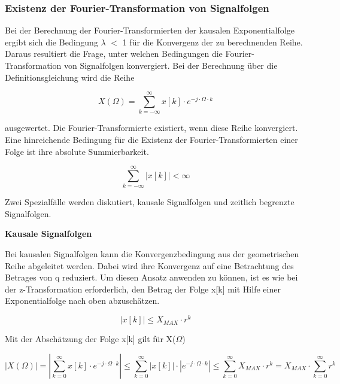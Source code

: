\subsubsection{Existenz der Fourier-Transformation von Signalfolgen}

\noindent Bei der Berechnung der Fourier-Transformierten der kausalen Exponentialfolge ergibt sich die Bedingung {\textbar}$\lambda${\textbar} $\mathrm{<}$ 1 f\"{u}r die Konvergenz der zu berechnenden Reihe. Daraus resultiert die Frage, unter welchen Bedingungen die Fourier-Transformation von Signalfolgen konvergiert. Bei der Berechnung \"{u}ber die Definitionsgleichung wird die Reihe 

\begin{equation}\label{eq:seventwentynine}
X\left(\Omega \right)=\sum _{k=-\infty }^{\infty }x\left[k\right]\cdot e^{-j\cdot \Omega \cdot k}
\end{equation}

\noindent ausgewertet. Die Fourier-Transformierte existiert, wenn diese Reihe konvergiert. Eine hinreichende Bedingung f\"{u}r die Existenz der Fourier-Transformierten einer Folge ist ihre absolute Summierbarkeit.

\begin{equation}\label{eq:seventhirty}
\sum _{k=-\infty }^{\infty }\left|x\left[k\right]\right|<\infty
\end{equation}

\noindent Zwei Spezialf\"{a}lle werden diskutiert, kausale Signalfolgen und zeitlich begrenzte Signalfolgen.\bigskip

{\selectfont
\noindent\textbf{Kausale Signalfolgen}}\smallskip

\noindent Bei kausalen Signalfolgen kann die Konvergenzbedingung aus der geometrischen Reihe abgeleitet werden. Dabei wird ihre Konvergenz auf eine Betrachtung des Betrages von q reduziert. Um diesen Ansatz anwenden zu k\"{o}nnen, ist es wie bei der z-Transformation erforderlich, den Betrag der Folge x[k] mit Hilfe einer Exponentialfolge nach oben abzusch\"{a}tzen. 

\begin{equation}\label{eq:seventhirtyone}
\left|x\left[k\right]\right|\le X_{MAX} \cdot r^{k}
\end{equation}

\noindent Mit der Absch\"{a}tzung der Folge x[k] gilt f\"{u}r X($\Omega$)

\begin{equation}\label{eq:seventhirtytwo}
\left|X\left(\Omega \right)\right|=\left|\sum _{k=0}^{\infty }x\left[k\right]\cdot e^{-j\cdot \Omega \cdot k}  \right|\le \sum _{k=0}^{\infty }\left|x\left[k\right]\right|\cdot \left|e^{-j\cdot \Omega \cdot k} \right| \le \sum _{k=0}^{\infty }X_{MAX} \cdot r^{k}  =X_{MAX} \cdot \sum _{k=0}^{\infty }r^{k} 
\end{equation}

